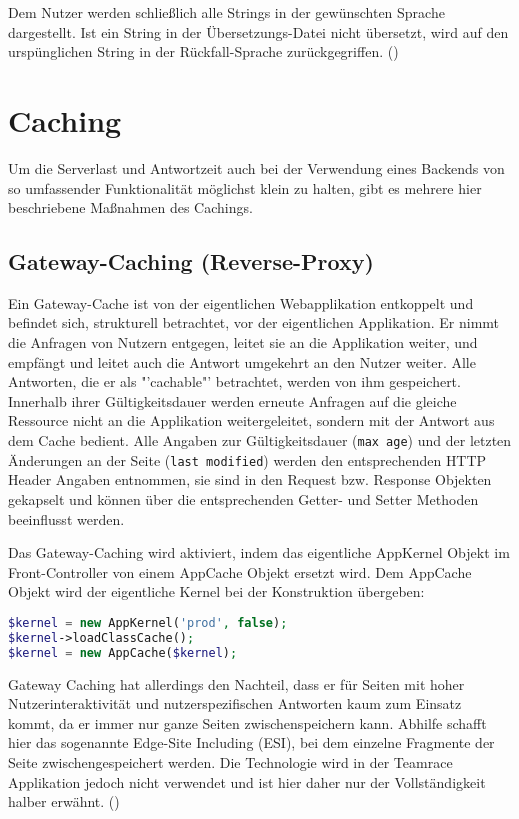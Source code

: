 \documentclass[12pt]{report}
\begin{document}
Dem Nutzer werden schließlich alle Strings in der gewünschten Sprache dargestellt. Ist ein String in der Übersetzungs-Datei nicht übersetzt, wird auf den urspünglichen String in der Rückfall-Sprache zurückgegriffen. (\cite{sf2:Translations})\\


\section{Caching}

Um die Serverlast und Antwortzeit auch bei der Verwendung eines Backends von so umfassender Funktionalität möglichst klein zu halten, gibt es mehrere hier beschriebene Maßnahmen des Cachings.

\subsection{Gateway-Caching (Reverse-Proxy)}

Ein Gateway-Cache ist von der eigentlichen Webapplikation entkoppelt und befindet sich, strukturell betrachtet, vor der eigentlichen Applikation. Er nimmt die Anfragen von Nutzern entgegen, leitet sie an die Applikation weiter, und empfängt und leitet auch die Antwort umgekehrt an den Nutzer weiter. Alle Antworten, die er als "'cachable"' betrachtet, werden von ihm gespeichert. Innerhalb ihrer Gültigkeitsdauer werden erneute Anfragen auf die gleiche Ressource nicht an die Applikation weitergeleitet, sondern mit der Antwort aus dem Cache bedient. Alle Angaben zur Gültigkeitsdauer (\texttt{max age}) und der letzten Änderungen an der Seite (\texttt{last modified}) werden den entsprechenden HTTP Header Angaben entnommen, sie sind in den Request bzw. Response Objekten gekapselt und können über die entsprechenden Getter- und Setter Methoden beeinflusst werden.

Das Gateway-Caching wird aktiviert, indem das eigentliche AppKernel Objekt im Front-Controller von einem AppCache Objekt ersetzt wird. Dem AppCache Objekt wird der eigentliche Kernel bei der Konstruktion übergeben:

\begin{lstlisting}[language=php, caption=Auszug aus web/app.php, showstringspaces=false]
$kernel = new AppKernel('prod', false);
$kernel->loadClassCache();
$kernel = new AppCache($kernel);
\end{lstlisting}

Gateway Caching hat allerdings den Nachteil, dass er für Seiten mit hoher Nutzerinteraktivität und nutzerspezifischen Antworten kaum zum Einsatz kommt, da er immer nur ganze Seiten zwischenspeichern kann. Abhilfe schafft hier das sogenannte Edge-Site Including (ESI), bei dem einzelne Fragmente der Seite zwischengespeichert werden. Die Technologie wird in der Teamrace Applikation jedoch nicht verwendet und ist hier daher nur der Vollständigkeit halber erwähnt. (\cite{sf2:Cache})
\end{document}
